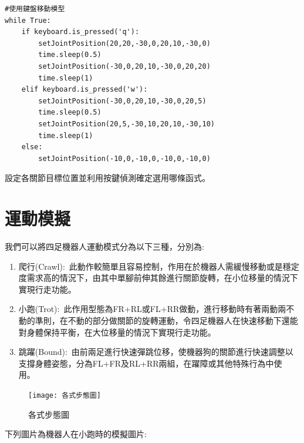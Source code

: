 \label{鍵盤控制及角度設定}
\begin{lstlisting}[caption=\Large 鍵盤控制及角度設定]
#使用鍵盤移動模型
while True:
    if keyboard.is_pressed('q'):
        setJointPosition(20,20,-30,0,20,10,-30,0)
        time.sleep(0.5)
        setJointPosition(-30,0,20,10,-30,0,20,20)
        time.sleep(1)
    elif keyboard.is_pressed('w'):
        setJointPosition(-30,0,20,10,-30,0,20,5)
        time.sleep(0.5)
        setJointPosition(20,5,-30,10,20,10,-30,10)
        time.sleep(1)
    else:
        setJointPosition(-10,0,-10,0,-10,0,-10,0)
\end{lstlisting}
設定各關節目標位置並利用按鍵偵測確定選用哪條函式。\\

\section{運動模擬}
我們可以將四足機器人運動模式分為以下三種，分別為:\
\begin{enumerate}
\item 爬行(Crawl):\
此動作較簡單且容易控制，作用在於機器人需緩慢移動或是穩定度需求高的情況下，由其中單腳前伸其餘進行關節旋轉，在小位移量的情況下實現行走功能。\
\item 小跑(Trot):\
此作用型態為FR+RL或FL+RR做動，進行移動時有著兩動兩不動的準則，在不動的部分做關節的旋轉運動，令四足機器人在快速移動下還能對身體保持平衡，在大位移量的情況下實現行走功能。\
\item 跳躍(Bound):\
由前兩足進行快速彈跳位移，使機器狗的關節進行快速調整以支撐身體姿態，分為FL+FR及RL+RR兩組，在躍障或其他特殊行為中使用。\
\end{enumerate}
\begin{figure}[hbt!]
\center
\texttt{[image: 各式步態圖]}
\caption{\Large 各式步態圖}\label{各式步態圖}
\end{figure}

下列圖片為機器人在小跑時的模擬圖片:\\

